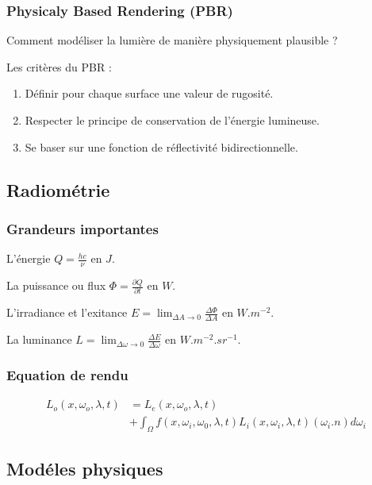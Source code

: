 \documentclass[handout]{beamer}
\begin{document}
\begin{frame}

    \frametitle{Physicaly Based Rendering (PBR)}

    Comment modéliser la lumière de manière physiquement plausible ?

    Les critères du PBR :
    \begin{enumerate}
        \item Définir pour chaque surface une valeur de rugosité.
        \item Respecter le principe de conservation de l'énergie lumineuse.
        \item Se baser sur une fonction de réflectivité bidirectionnelle.
    \end{enumerate}
    
\end{frame}

\subsection{Radiométrie}

\begin{frame}

    \frametitle{Grandeurs importantes}

    L'énergie $ Q = \frac{hc}{\nu} $ en $ J $.

    La puissance ou flux $ \Phi = \frac{\partial Q}{\partial t} $ en $ W $.

    L'irradiance et l'exitance $ E = \lim_{\Delta A \to 0}  \frac{\Delta \Phi }{\Delta A} $ en $W.m^{-2} $.

    La luminance $ L = \lim_{\Delta \omega \to 0}  \frac{\Delta E }{\Delta \omega } $ en $ W.m^{-2}.sr^{-1} $.
\end{frame}

\begin{frame}

    \frametitle{Equation de rendu}

    \begin{align*}
        L_o(x, \omega_o, \lambda, t)
        &= L_e(x, \omega_o, \lambda, t) \\
        &+ \int_{\Omega}^{} f(x, \omega_i, \omega_0, \lambda, t)
        L_i(x, \omega_i, \lambda, t)
        (\omega_i . n) d\omega_i
    \end{align*}

\end{frame}

\subsection{Modéles physiques}
\end{document}
